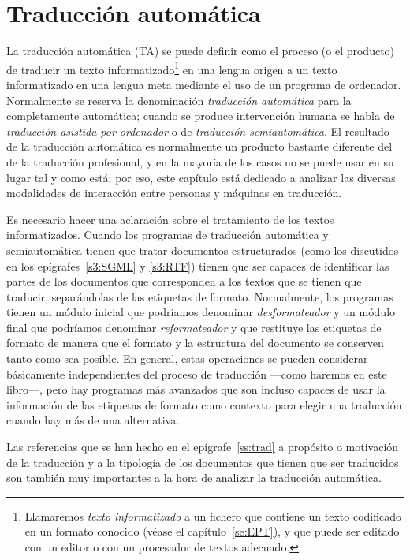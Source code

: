 \section{Traducción automática} \label{ss:TA} 

La traducción automática (TA) se puede definir como el proceso (o el producto) de traducir un texto informatizado\footnote{Llamaremos \emph{texto informatizado} a un fichero que contiene un texto codificado en un formato conocido (véase el capítulo~\ref{se:EPT}), y que puede ser editado con un editor o con un procesador de textos adecuado.} en una lengua origen a un texto informatizado en una lengua meta mediante el uso de un programa de ordenador. Normalmente se reserva la denominación \emph{traducción automática} para la completamente automática; cuando se produce intervención humana se habla de {\em traducción asistida por ordenador} o de \emph{traducción semiautomática}. El resultado de la traducción automática es normalmente un producto bastante diferente del de la traducción profesional, y en la mayoría de los casos no se puede usar en su lugar tal y como está; por eso, este capítulo está dedicado a analizar las diversas modalidades de interacción entre personas y máquinas en traducción. 

Es necesario hacer una aclaración sobre el tratamiento de los textos informatizados. Cuando los programas de traducción automática y semiautomática tienen que tratar documentos estructurados (como los discutidos en los epígrafes~\ref{s3:SGML} y \ref{s3:RTF}) tienen que ser capaces de identificar las partes de los documentos que corresponden a los textos que se tienen que traducir, separándolas de las etiquetas de formato. Normalmente, los programas tienen un módulo inicial que podríamos denominar \emph{desformateador} y un módulo final que podríamos denominar \emph{reformateador} y que restituye las etiquetas de formato de manera que el formato y la estructura del documento se conserven tanto como sea posible. En general, estas operaciones se pueden considerar básicamente independientes del proceso de traducción ---como haremos en este libro---, pero hay programas más avanzados que son incluso capaces de usar la información de las etiquetas de formato como contexto para elegir una traducción cuando hay más de una alternativa. 

Las referencias que se han hecho en el epígrafe~\ref{ss:trad} a propósito o motivación de la traducción y a la tipología de los documentos que tienen que ser traducidos son también muy importantes a la hora de analizar la traducción automática. 

